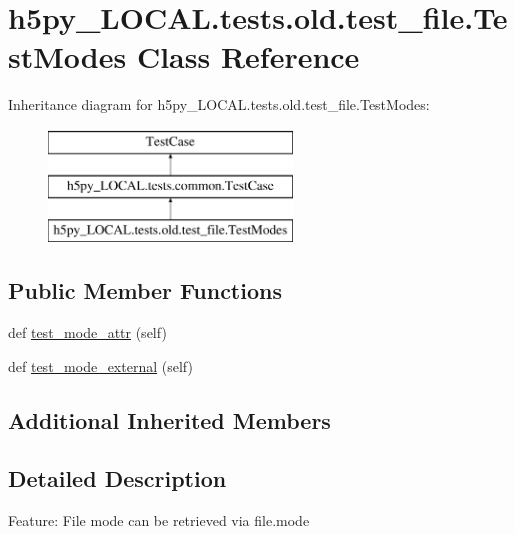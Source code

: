 \hypertarget{classh5py__LOCAL_1_1tests_1_1old_1_1test__file_1_1TestModes}{}\section{h5py\+\_\+\+L\+O\+C\+A\+L.\+tests.\+old.\+test\+\_\+file.\+Test\+Modes Class Reference}
\label{classh5py__LOCAL_1_1tests_1_1old_1_1test__file_1_1TestModes}
Inheritance diagram for h5py\+\_\+\+L\+O\+C\+A\+L.\+tests.\+old.\+test\+\_\+file.\+Test\+Modes\+:\begin{figure}[H]
\begin{center}
\leavevmode
\includegraphics[height=3.000000cm]{classh5py__LOCAL_1_1tests_1_1old_1_1test__file_1_1TestModes}
\end{center}
\end{figure}
\subsection*{Public Member Functions}
\begin{DoxyCompactItemize}
\item 
def \hyperlink{classh5py__LOCAL_1_1tests_1_1old_1_1test__file_1_1TestModes_a70febf670c2ebe29a3618cf3b05346f7}{test\+\_\+mode\+\_\+attr} (self)
\item 
def \hyperlink{classh5py__LOCAL_1_1tests_1_1old_1_1test__file_1_1TestModes_a25cef3c93e9cd8462c56846f7eecca03}{test\+\_\+mode\+\_\+external} (self)
\end{DoxyCompactItemize}
\subsection*{Additional Inherited Members}


\subsection{Detailed Description}
\begin{DoxyVerb}    Feature: File mode can be retrieved via file.mode
\end{DoxyVerb}
 

